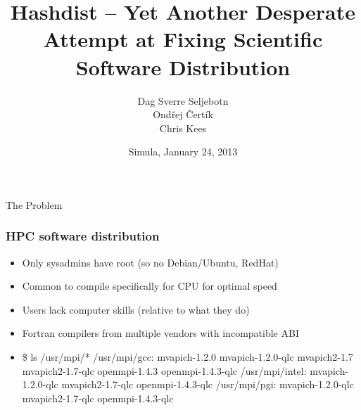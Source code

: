 \documentclass[sans,mathserif]{beamer}
\title{Hashdist -- Yet Another Desperate Attempt at Fixing Scientific Software Distribution}
\author{Dag Sverre Seljebotn\\Ond\v{r}ej \v{C}ert\'{i}k\\Chris Kees}
\date{Simula, January 24, 2013}
\begin{document}
\begin{frame}
  \titlepage
\end{frame}

\begin{frame}
  \begin{center}
    {\LARGE The Problem}
  \end{center}
\end{frame}


\begin{frame}[fragile]
  \frametitle{HPC software distribution}
  \begin{itemize}
  \item<+-> Only sysadmins have root (so no Debian/Ubuntu, RedHat)
  \item<+-> Common to compile specifically for CPU for optimal speed
  \item<+-> Users lack computer skills (relative to what they do)
  \item<+-> Fortran compilers from multiple vendors with incompatible ABI
\item<+->
{\small
  \begin{semiverbatim}
\$ ls /usr/mpi/*
/usr/mpi/gcc:
mvapich-1.2.0  mvapich-1.2.0-qlc  mvapich2-1.7
mvapich2-1.7-qlc  openmpi-1.4.3  openmpi-1.4.3-qlc
/usr/mpi/intel:
mvapich-1.2.0-qlc  mvapich2-1.7-qlc  openmpi-1.4.3-qlc
/usr/mpi/pgi:
mvapich-1.2.0-qlc  mvapich2-1.7-qlc  openmpi-1.4.3-qlc
  \end{semiverbatim}
}
\end{itemize}
\end{frame}
\end{document}
